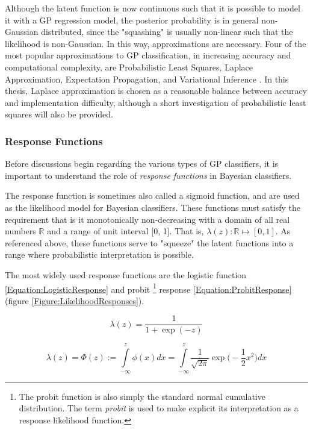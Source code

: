 			Although the latent function is now continuous such that it is possible to model it with a GP regression model, the posterior probability is in general non-Gaussian distributed, since the "squashing" is usually non-linear such that the likelihood is non-Gaussian. In this way, approximations are necessary. Four of the most popular approximations to GP classification, in increasing accuracy and computational complexity, are Probabilistic Least Squares, Laplace Approximation, Expectation Propagation, and Variational Inference \citep{GaussianProcessForMachineLearning}. In this thesis, Laplace approximation is chosen as a reasonable balance between accuracy and implementation difficulty, although a short investigation of probabilistic least squares will also be provided.
			
			\subsubsection{Response Functions}
			
				Before discussions begin regarding the various types of GP classifiers, it is important to understand the role of \textit{response functions} in Bayesian classifiers.
				
				The response function is sometimes also called a sigmoid function, and are used as the likelihood model for Bayesian classifiers. These functions must satisfy the requirement that is it monotonically non-decreasing with a domain of all real numbers $\mathbb{R}$ and a range of unit interval [0, 1]. That is, $\lambda(z): \mathbb{R} \mapsto [0, 1]$. As referenced above, these functions serve to "squeeze" the latent functions into a range where probabilistic interpretation is possible.
				
				The most widely used response functions are the logistic function \eqref{Equation:LogisticResponse} and probit \footnote{The probit function is also simply the standard normal cumulative distribution. The term \textit{probit} is used to make explicit its interpretation as a response likelihood function.} response \eqref{Equation:ProbitResponse} (figure \ref{Figure:LikelihoodResponses}).
				
				\begin{equation}
					\lambda(z) = \frac{1}{1 + \exp(-z)}
				\label{Equation:LogisticResponse}
				\end{equation}
				
				\begin{equation}
					\lambda(z) = \Phi(z) := \int\limits_{-\infty}^{z} \phi(x) dx =  \int\limits_{-\infty}^{z} \frac{1}{\sqrt{2 \pi}} \exp\Big(- \frac{1}{2} x^{2}\Big) dx
				\label{Equation:ProbitResponse}
				\end{equation}
			
